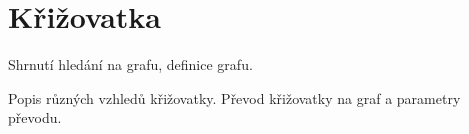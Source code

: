 \section{Křižovatka}\label{sec:krizovatka}

Shrnutí hledání na grafu, definice grafu.

Popis různých vzhledů křižovatky.
Převod křižovatky na graf a parametry převodu.

%
%
%
%
%
%
%

